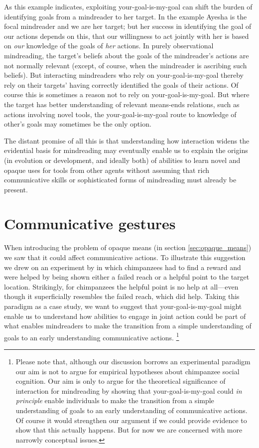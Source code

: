 \documentclass[14pt,a4paper]{extarticle}
\begin{document}
As this example indicates,
exploiting your-goal-is-my-goal 
can shift the burden of identifying goals from a mindreader to her target.
In the example Ayesha is the focal mindreader and we are her target;
but her success in identifying the goal of our actions
depends on this,
that our willingness to act jointly with her is based on \emph{our} knowledge of the goals of \emph{her} actions.
In purely observational mindreading, the target's beliefs about the goals of the mindreader's actions are not normally relevant (except, of course, when the mindreader is ascribing such beliefs).
But interacting mindreaders who rely on your-goal-is-my-goal
thereby rely on their targets' having correctly identified the goals of their actions.
Of course this is sometimes a reason not to rely on your-goal-is-my-goal.
But where the target has better understanding of relevant means-ends relations,
such as actions involving novel tools,
the your-goal-is-my-goal route to knowledge of other's goals may sometimes be the only option.

The distant promise of all this is that 
understanding how interaction widens the evidential basis for mindreading
may eventually enable us to explain
the origins (in evolution or development, and ideally both) of abilities to learn novel and opaque uses for tools from other agents
without assuming that 
rich communicative skills
or 
sophisticated forms of mindreading 
must already be  present.


\section{Communicative gestures}
When introducing the problem of opaque means 
(in section \vref{sec:opaque_means})
we saw that it could  affect
communicative actions.
To illustrate this suggestion we drew on 
an experiment by \citet{hare_chimpanzees_2004}
in which chimpanzees had to find a reward 
and were helped by being shown either a failed reach or  a helpful point to the target location.
Strikingly, for chimpanzees the helpful point is no help at all---even though it superficially resembles the failed reach, which  did help.
Taking this paradigm as a case study, 
we want to suggest that your-goal-is-my-goal might 
enable us to understand how abilities to engage in joint action 
could be part of what enables mindreaders to make the transition from 
a simple understanding of goals 
to 
an early understanding communicative actions.%
\footnote{
Please note that, although our discussion borrows an experimental paradigm
our aim is not to argue for empirical hypotheses about chimpanzee social cognition.
Our aim is only to argue for the theoretical significance of interaction for mindreading by showing 
that your-goal-is-my-goal
could \emph{in principle} enable
individuals to make the transition 
from
 a simple understanding of goals
to
 an early understanding of communicative actions.
Of course it would strengthen our argument if we could provide evidence to show that this actually happens.
But for now we are concerned with more narrowly conceptual issues.
}
\end{document}

